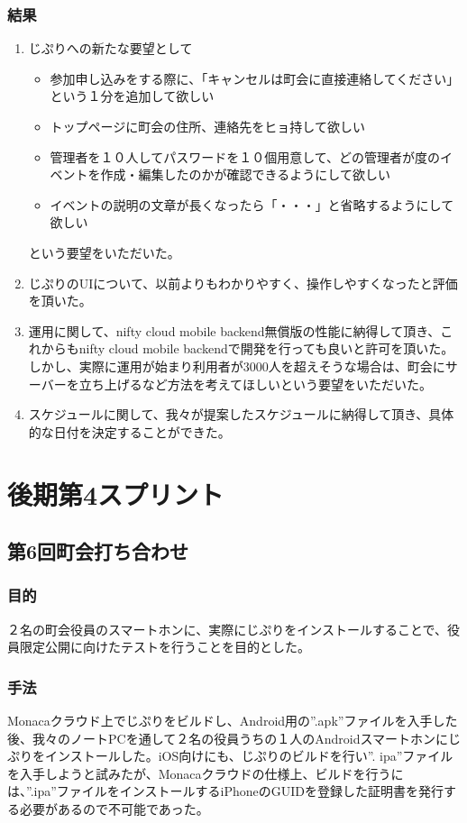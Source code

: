 \subsubsection{結果}
\begin{enumerate}
    \item じぷりへの新たな要望として
    \begin{itemize}
        \item 参加申し込みをする際に、「キャンセルは町会に直接連絡してください」という１分を追加して欲しい
        \item トップページに町会の住所、連絡先をヒョ持して欲しい
        \item 管理者を１０人してパスワードを１０個用意して、どの管理者が度のイベントを作成・編集したのかが確認できるようにして欲しい
        \item イベントの説明の文章が長くなったら「・・・」と省略するようにして欲しい
    \end{itemize}
    という要望をいただいた。
    \item じぷりのUIについて、以前よりもわかりやすく、操作しやすくなったと評価を頂いた。
    \item 運用に関して、nifty cloud mobile backend無償版の性能に納得して頂き、これからもnifty cloud mobile backendで開発を行っても良いと許可を頂いた。
    しかし、実際に運用が始まり利用者が3000人を超えそうな場合は、町会にサーバーを立ち上げるなど方法を考えてほしいという要望をいただいた。

    \item スケジュールに関して、我々が提案したスケジュールに納得して頂き、具体的な日付を決定することができた。
\end{enumerate}

\section{後期第4スプリント}
\subsection{第6回町会打ち合わせ}
\subsubsection{目的}
２名の町会役員のスマートホンに、実際にじぷりをインストールすることで、役員限定公開に向けたテストを行うことを目的とした。
\subsubsection{手法}
Monacaクラウド上でじぷりをビルドし、Android用の”.apk”ファイルを入手した後、我々のノートPCを通して２名の役員うちの１人のAndroidスマートホンにじぷりをインストールした。iOS向けにも、じぷりのビルドを行い”.
ipa”ファイルを入手しようと試みたが、Monacaクラウドの仕様上、ビルドを行うには、”.ipa”ファイルをインストールするiPhoneのGUIDを登録した証明書を発行する必要があるので不可能であった。
